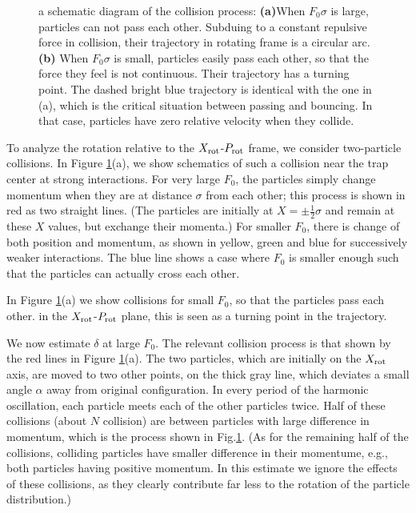 \documentclass[aps,preprintnumbers,onecolumn,amsmath,amssymb,floatfix,pra]{revtex4-1}
\begin{document}
\begin{figure}[h
]
{\begin{minipage}[b]{0.4\textwidth}
\end{minipage}
}
\caption{a schematic diagram of the collision process: \textbf{(a)}When $F_0\sigma$ is large, particles can not pass each other. Subduing to a constant repulsive force in collision, their trajectory in rotating frame is a circular arc.  \textbf{(b)} When $F_0\sigma$ is small, particles easily pass each other, so that the force they feel is not continuous. Their trajectory has a turning point. The dashed bright blue trajectory is identical with the one in (a), which is the critical situation between passing and bouncing. In that case, particles have zero relative velocity when they collide. }
\label{fig:Breathingfrequency3}
\end{figure}



To analyze the rotation relative to the $X_{\rm rot}$-$P_{\rm rot}$ frame, we consider two-particle
collisions.  In Figure \ref{fig:Breathingfrequency3}(a), we show schematics of such a collision near
the trap center at strong interactions.  For very large $F_0$, the particles simply change momentum
when they are at distance $\sigma$ from each other; this process is shown in red as two straight
lines.  (The particles are initially at $X=\pm\frac{1}{2}\sigma$ and remain at these $X$ values,
but exchange their momenta.)   For smaller $F_0$, there is change of both position and momentum, as shown in yellow, green
and blue for successively weaker interactions. The blue line shows a case where $F_0$ is smaller
enough such that the particles can actually cross each other.

In Figure \ref{fig:Breathingfrequency3}(a) we show collisions for small $F_0$, so that the particles
pass each other.  in the $X_{\rm rot}$-$P_{\rm rot}$ plane, this is seen as a turning point in the trajectory.  

We now estimate $\delta$ at large $F_0$.  The relevant collision process is that shown by the red
lines in Figure \ref{fig:Breathingfrequency3}(a).  The two particles, which are initially on the
$X_{\rm rot}$ axis, are moved to two other points, on the thick gray line, which deviates a small
angle $\alpha$ away from original configuration.  In every period of the harmonic oscillation, each
particle meets each of the other particles twice.  Half of these collisions (about $N$ collision)
are between particles with large difference in momentum, which is the process shown in
Fig.\ref{fig:Breathingfrequency3}.  (As for the remaining half of the collisions, colliding
particles have smaller difference in their momentume, e.g., both particles having positive
momentum.  In this estimate we  ignore the effects of these collisions, as they clearly contribute
far less to the rotation of the particle distribution.)
\end{document}
